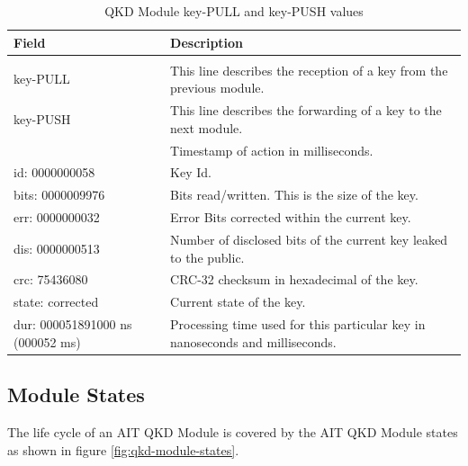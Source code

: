\begin{table}[h]
    \begin{tabular}{lp{7.5cm}}
    Field                   &   Description \\
    \hline
    \\
    key-PULL                &   This line describes the reception of a key from the previous module.\\ [0.7em]    
    key-PUSH                &   This line describes the forwarding of a key to the next module.\\ [0.7em]    
    [000000000005088ms]     &   Timestamp of action in milliseconds.\\[0.7em]
    id: 0000000058          &   Key Id.\\[0.7em]
    bits: 0000009976        &   Bits read/written. This is the size of the key.\\[0.7em]
    err: 0000000032         &   Error Bits corrected within the current key.\\[0.7em]
    dis: 0000000513         &   Number of disclosed bits of the current key leaked to the public.\\[0.7em]
    crc: 75436080           &   CRC-32 checksum in hexadecimal of the key.\\[0.7em]
    state: corrected        &   Current state of the key.\\[0.7em]
    dur: 000051891000 ns (000052 ms)    &   Processing time used for this particular key in nanoseconds and milliseconds.\\[0.7em]
    \end{tabular}
    \caption{QKD Module key-PULL and key-PUSH values}
    \label{tab:QKD Module key-PULL and key-PUSH}
\end{table}

\medskip

\subsection{Module States}
\label{subsec:Module States}

The life cycle of an AIT QKD Module is covered by the AIT QKD Module states as shown in figure \ref{fig:qkd-module-states}.

